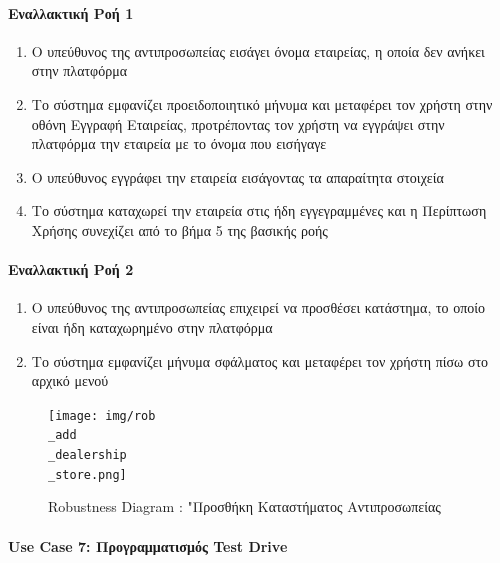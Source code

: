 \documentclass{../ol-softwaremanual}
\begin{document}
	\paragraph{Εναλλακτική Ροή 1}

	\begin{enumerate}
		\item Ο υπεύθυνος της αντιπροσωπείας εισάγει όνομα εταιρείας, η οποία δεν ανήκει στην πλατφόρμα
		\item Το σύστημα εμφανίζει προειδοποιητικό μήνυμα και μεταφέρει τον χρήστη στην οθόνη Εγγραφή Εταιρείας, προτρέποντας τον χρήστη να εγγράψει στην πλατφόρμα την εταιρεία με το όνομα που εισήγαγε		
		\item Ο υπεύθυνος εγγράφει την εταιρεία εισάγοντας τα απαραίτητα στοιχεία
		\item Το σύστημα καταχωρεί την εταιρεία στις ήδη εγγεγραμμένες και η Περίπτωση Χρήσης συνεχίζει από το βήμα 5 της βασικής ροής
	\end{enumerate}

	\paragraph{Εναλλακτική Ροή 2}

	\begin{enumerate}
		\item Ο υπεύθυνος της αντιπροσωπείας επιχειρεί να προσθέσει κατάστημα, το οποίο είναι ήδη καταχωρημένο στην πλατφόρμα
		\item Το σύστημα εμφανίζει μήνυμα σφάλματος και μεταφέρει τον χρήστη πίσω στο αρχικό μενού
	\end{enumerate}
	
	\begin{figure}[htbp!]
		\texttt{[image: img/rob\\\_add\\\_dealership\\\_store.png]}
		\caption{\en Robustness Diagram : "\gr Προσθήκη Καταστήματος Αντιπροσωπείας}
	\end{figure}
	
	
	\newpage
	\centering
	\paragraph{\en Use Case 7: \gr Προγραμματισμός \en Test Drive \gr}
	
\end{document}
